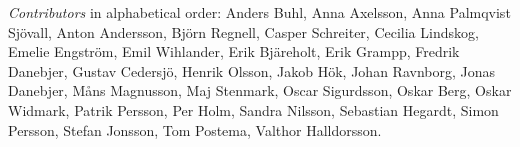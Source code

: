 \emph{Contributors} in alphabetical order:
Anders Buhl,
Anna Axelsson,
Anna Palmqvist Sjövall,
Anton Andersson,
Björn Regnell,
Casper Schreiter,
Cecilia Lindskog,
Emelie Engström,
Emil Wihlander,
Erik Bjäreholt,
Erik Grampp,
Fredrik Danebjer,
Gustav Cedersjö,
Henrik Olsson,
Jakob Hök,
Johan Ravnborg,
Jonas Danebjer, 
Måns Magnusson,
Maj Stenmark,
Oscar Sigurdsson,
Oskar Berg,
Oskar Widmark,
Patrik Persson,
Per Holm,
Sandra Nilsson,
Sebastian Hegardt,
Simon Persson,
Stefan Jonsson,
Tom Postema,
Valthor Halldorsson. 
